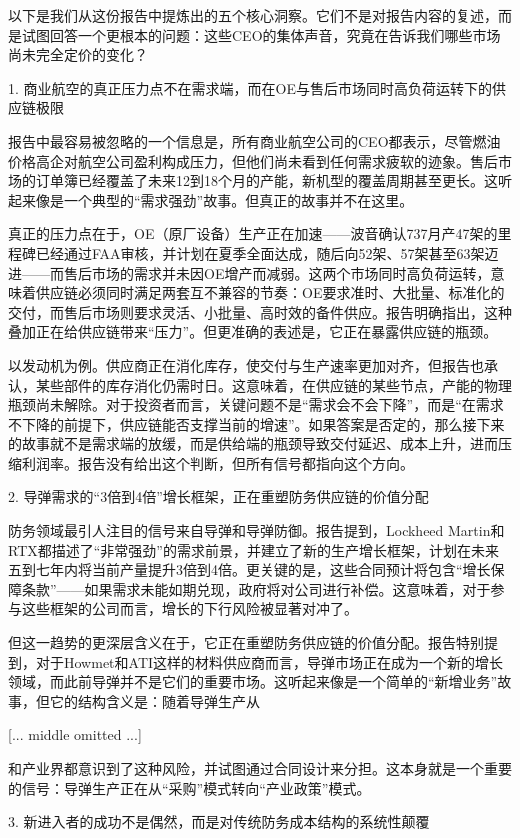 \documentclass[11pt]{ctexart}
\begin{document}
以下是我们从这份报告中提炼出的五个核心洞察。它们不是对报告内容的复述，而是试图回答一个更根本的问题：这些CEO的集体声音，究竟在告诉我们哪些市场尚未完全定价的变化？

1. 商业航空的真正压力点不在需求端，而在OE与售后市场同时高负荷运转下的供应链极限

报告中最容易被忽略的一个信息是，所有商业航空公司的CEO都表示，尽管燃油价格高企对航空公司盈利构成压力，但他们尚未看到任何需求疲软的迹象。售后市场的订单簿已经覆盖了未来12到18个月的产能，新机型的覆盖周期甚至更长。这听起来像是一个典型的“需求强劲”故事。但真正的故事并不在这里。

真正的压力点在于，OE（原厂设备）生产正在加速——波音确认737月产47架的里程碑已经通过FAA审核，并计划在夏季全面达成，随后向52架、57架甚至63架迈进——而售后市场的需求并未因OE增产而减弱。这两个市场同时高负荷运转，意味着供应链必须同时满足两套互不兼容的节奏：OE要求准时、大批量、标准化的交付，而售后市场则要求灵活、小批量、高时效的备件供应。报告明确指出，这种叠加正在给供应链带来“压力”。但更准确的表述是，它正在暴露供应链的瓶颈。

以发动机为例。供应商正在消化库存，使交付与生产速率更加对齐，但报告也承认，某些部件的库存消化仍需时日。这意味着，在供应链的某些节点，产能的物理瓶颈尚未解除。对于投资者而言，关键问题不是“需求会不会下降”，而是“在需求不下降的前提下，供应链能否支撑当前的增速”。如果答案是否定的，那么接下来的故事就不是需求端的放缓，而是供给端的瓶颈导致交付延迟、成本上升，进而压缩利润率。报告没有给出这个判断，但所有信号都指向这个方向。

2. 导弹需求的“3倍到4倍”增长框架，正在重塑防务供应链的价值分配

防务领域最引人注目的信号来自导弹和导弹防御。报告提到，Lockheed Martin和RTX都描述了“非常强劲”的需求前景，并建立了新的生产增长框架，计划在未来五到七年内将当前产量提升3倍到4倍。更关键的是，这些合同预计将包含“增长保障条款”——如果需求未能如期兑现，政府将对公司进行补偿。这意味着，对于参与这些框架的公司而言，增长的下行风险被显著对冲了。

但这一趋势的更深层含义在于，它正在重塑防务供应链的价值分配。报告特别提到，对于Howmet和ATI这样的材料供应商而言，导弹市场正在成为一个新的增长领域，而此前导弹并不是它们的重要市场。这听起来像是一个简单的“新增业务”故事，但它的结构含义是：随着导弹生产从

[... middle omitted ...]

和产业界都意识到了这种风险，并试图通过合同设计来分担。这本身就是一个重要的信号：导弹生产正在从“采购”模式转向“产业政策”模式。

3. 新进入者的成功不是偶然，而是对传统防务成本结构的系统性颠覆
\end{document}
